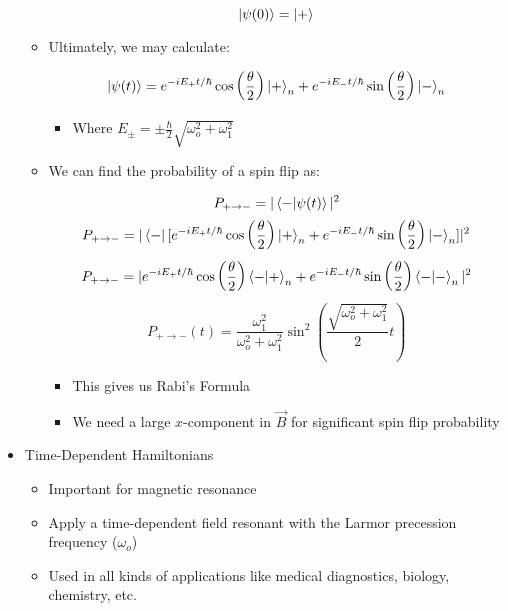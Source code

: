 \begin{itemize}
\begin{itemize}
        $$\ket{\psi(0)}=\ket{+}$$

      \item Ultimately, we may calculate:

        $$\ket{\psi(t)}=e^{-iE_+t/\hbar}\cos\left( \frac{\theta}{2} \right)\ket{+}_n+e^{-iE_-t/\hbar}\sin\left( \frac{\theta}{2} \right)\ket{-}_n$$

        \begin{itemize}

          \item Where $E_{\pm}=\pm\frac{\hbar}{2}\sqrt{\omega_o^2+\omega_1^2}$

        \end{itemize}

      \item We can find the probability of a spin flip as:

        $$P_{+\to-}=|\bra{-}\ket{\psi(t)}|^2$$
        $$P_{+\to-}=|\bra{-}[e^{-iE_+t/\hbar}\cos\left( \frac{\theta}{2} \right)\ket{+}_n+e^{-iE_-t/\hbar}\sin\left( \frac{\theta}{2} \right)\ket{-}_n]|^2$$
        $$P_{+\to-}=|e^{-iE_+t/\hbar}\cos\left( \frac{\theta}{2} \right)\bra{-}\ket{+}_n+e^{-iE_-t/\hbar}\sin\left( \frac{\theta}{2} \right)\bra{-}\ket{-}_n|^2$$
        $$P_{+\to-}(t)=\frac{\omega_1^2}{\omega_o^2+\omega_1^2}\sin^2\left( \frac{\sqrt{\omega_o^2+\omega_1^2}}{2} t\right)$$

        \begin{itemize}

          \item This gives us Rabi's Formula

          \item We need a large $x$-component in $\vec{B}$ for significant spin flip probability

        \end{itemize}

    \end{itemize}

  \item Time-Dependent Hamiltonians

    \begin{itemize}

      \item Important for magnetic resonance

      \item Apply a time-dependent field resonant with the Larmor precession frequency ($\omega_o$)

      \item Used in all kinds of applications like medical diagnostics, biology, chemistry, etc.


\end{itemize}
\end{itemize}
